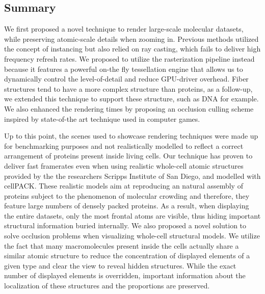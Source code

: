 \subsection{Summary}

We first proposed a novel technique to render large-scale molecular datasets, while preserving atomic-scale details when zooming in.
Previous methods utilized the concept of instancing but also relied on ray casting, which fails to deliver high frequency refresh rates. 
We proposed to utilize the rasterization pipeline instead because it features a powerful on-the fly tessellation engine that allows us to dynamically control the level-of-detail and reduce GPU-driver overhead. 
Fiber structures tend to have a more complex structure than proteins, as a follow-up, we extended this technique to support these structure, such as DNA for example.
We also enhanced the rendering times by proposing an occlusion culling scheme inspired by state-of-the art technique used in computer games. 

Up to this point, the scenes used to showcase rendering techniques were made up for benchmarking purposes and not realistically modelled to reflect a correct arrangement of proteins present inside living cells.
Our technique has proven to deliver fast framerates even when using realistic whole-cell atomic structures provided by the the researchers Scripps Institute of San Diego, and modelled with cellPACK.
These realistic models aim at reproducing an natural assembly of proteins subject to the phenomenon of molecular crowding and therefore, they feature large numbers of densely packed proteins.
As a result, when displaying the entire datasets, only the most frontal atoms are visible, thus hiding important structural information buried internally.
We also proposed a novel solution to solve occlusion problems when visualizing whole-cell structural models.
We utilize the fact that many macromolecules present inside the cells actually share a similar atomic structure to reduce the concentration of displayed elements of a given type and clear the view to reveal hidden structures.
While the exact number of displayed elements is overridden, important information about the localization of these structures and the proportions are preserved.

